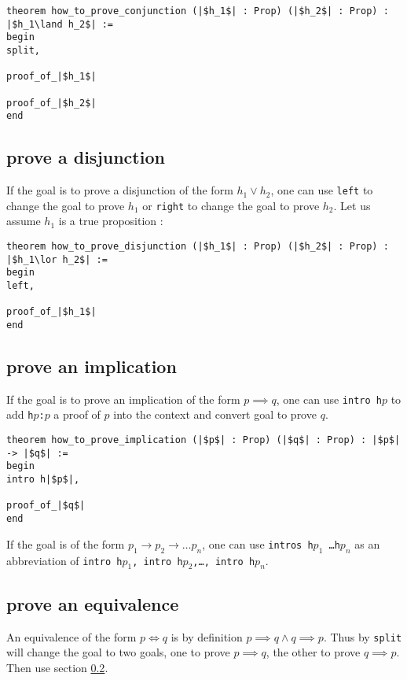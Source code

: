 \documentclass{report}
\theoremstyle{definition}
\theoremstyle{plain}
\begin{document}
\begin{verbatim}
theorem how_to_prove_conjunction (|$h_1$| : Prop) (|$h_2$| : Prop) : |$h_1\land h_2$| :=
begin
split,

proof_of_|$h_1$|

proof_of_|$h_2$|
end
\end{verbatim}


\subsection{prove a disjunction}\label{lean:disjun}
If the goal is to prove a disjunction of the form $h_1 \lor h_2$, one can use {\tt left} to change the goal to prove $h_1$ or {\tt right} to change the goal to prove $h_2$. Let us assume $h_1$ is a true proposition :

\begin{verbatim}
theorem how_to_prove_disjunction (|$h_1$| : Prop) (|$h_2$| : Prop) : |$h_1\lor h_2$| :=
begin
left,
  
proof_of_|$h_1$|
end
\end{verbatim}


\subsection{prove an implication}\label{lean:imp}
If the goal is to prove an implication of the form $p \implies q$, one can use {\tt intro h$p$} to add {\tt h$p$:$p$} a proof of $p$ into the context and convert goal to prove $q$.

\begin{verbatim}
theorem how_to_prove_implication (|$p$| : Prop) (|$q$| : Prop) : |$p$| -> |$q$| :=
begin
intro h|$p$|,
  
proof_of_|$q$|
end
\end{verbatim}

If the goal is of the form $p_1\to p_2\to\dots p_n$, one can use {\tt intros h$p_1$ \dots h$p_n$} as an abbreviation of {\tt intro h$p_1$, intro h$p_2$,\dots, intro h$p_n$}.


\subsection{prove an equivalence}\label{lean:eqv}
An equivalence of the form $p \iff q$ is by definition $p\implies q \land q\implies p$. Thus by {\tt split} will change the goal to two goals, one to prove $p\implies q$, the other to prove $q \implies p$. Then use section \ref{lean:imp}.
\end{document}
